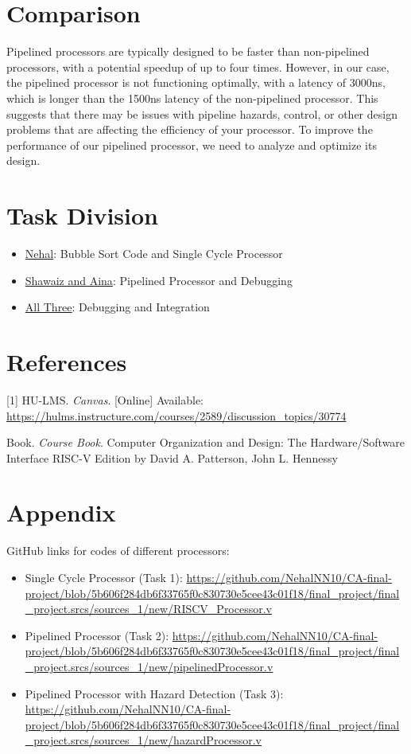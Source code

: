 \documentclass{report}
\begin{document}
\chapter{Comparison}

Pipelined processors are typically designed to be faster than non-pipelined processors, with a potential speedup of up to four times. However, in our case, the pipelined processor is not functioning optimally, with a latency of 3000ns, which is longer than the 1500ns latency of the non-pipelined processor. This suggests that there may be issues with pipeline hazards, control, or other design problems that are affecting the efficiency of your processor. To improve the performance of our pipelined processor, we need to analyze and optimize its design.

\chapter{Task Division}
\begin{itemize}
    \item {\large \underline{Nehal}: Bubble Sort Code and Single Cycle Processor}
    \item {\large \underline{Shawaiz and Aina}: Pipelined Processor and Debugging}
    \item {\large \underline{All Three}: Debugging and Integration}
\end{itemize}

\chapter{References}

[1] HU-LMS. \textit{Canvas}. [Online] Available: \url{https://hulms.instructure.com/courses/2589/discussion_topics/30774}

\noindent[2] Book. \textit{Course Book}. Computer Organization and Design: The Hardware/Software Interface RISC-V Edition by David A. Patterson, John L. Hennessy

\appendix
\chapter{Appendix}

GitHub links for codes of different processors: 
\begin{itemize}
    \item Single Cycle Processor (Task 1): \url{https://github.com/NehalNN10/CA-final-project/blob/5b606f284db6f33765f0c830730e5cee43c01f18/final_project/final_project.srcs/sources_1/new/RISCV_Processor.v}
    \item Pipelined Processor (Task 2): \url{https://github.com/NehalNN10/CA-final-project/blob/5b606f284db6f33765f0c830730e5cee43c01f18/final_project/final_project.srcs/sources_1/new/pipelinedProcessor.v}
    \item Pipelined Processor with Hazard Detection (Task 3): \url{https://github.com/NehalNN10/CA-final-project/blob/5b606f284db6f33765f0c830730e5cee43c01f18/final_project/final_project.srcs/sources_1/new/hazardProcessor.v}
\end{itemize}
\end{document}
